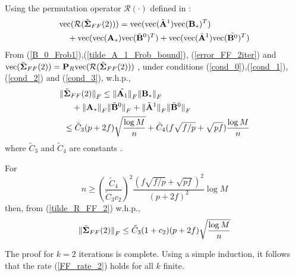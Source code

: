 \begin{IEEEproof}
Using the permutation operator $\mathcal{R}(\cdot)$ defined in \cite{EstCovMatKron}:
\begin{align}
	& { \text{vec} }(\mathcal{R}(\tilde{{\mathbf{\Sigma}}}_{FF}(2))) = { \text{vec} }({ \text{vec} }(\tilde{{\mathbf{A}}}^1){ \text{vec} }({\mathbf{B}}_*)^T) \nonumber \\
		&\quad + { \text{vec} }({ \text{vec} }({\mathbf{A}}_*){ \text{vec} }(\tilde{{\mathbf{B}}}^0)^T) + { \text{vec} }({ \text{vec} }(\tilde{{\mathbf{A}}}^1){ \text{vec} }(\tilde{{\mathbf{B}}^0})^T) \label{error_FF_2iter}
\end{align}
From (\ref{B_0_Frob1}),(\ref{tilde_A_1_Frob_bound}), (\ref{error_FF_2iter}) and ${ \text{vec} }(\tilde{{\mathbf{\Sigma}}}_{FF}(2)) = {\mathbf{P}}_R { \text{vec} }(\mathcal{R}(\tilde{{\mathbf{\Sigma}}}_{FF}(2)))$ \cite{EstCovMatKron}, under conditions (\ref{cond_0}),(\ref{cond_1}),(\ref{cond_2}) and (\ref{cond_3}), w.h.p.,
\begin{align}
	{ \parallel } &\tilde{{\mathbf{\Sigma}}}_{FF}(2) { \parallel }_F \leq { \parallel } \tilde{{\mathbf{A}}_1} { \parallel }_F { \parallel } {\mathbf{B}}_*{ \parallel }_F \nonumber \\
		&\quad + { \parallel } {\mathbf{A}}_*{ \parallel }_F { \parallel } \tilde{{\mathbf{B}}}^0 { \parallel }_F + { \parallel } \tilde{{\mathbf{A}}}^1{ \parallel }_F { \parallel } \tilde{{\mathbf{B}}}^0{ \parallel }_F \nonumber \\
		&\leq \tilde{C}_3 (p+2f) \sqrt{\frac{\log M}{n}} + \tilde{C}_4 (f\sqrt{f/p}+\sqrt{pf}) \frac{\log M}{n} \label{tilde_R_FF_2}
\end{align}
where $\tilde{C}_3$ and $\tilde{C}_4$ are constants \cite{TsiligkaridisTSP}.

For
\begin{equation*}
	n \geq (\frac{\tilde{C}_4}{\tilde{C}_3 c_2})^2 \frac{(f\sqrt{f/p}+\sqrt{pf})^2}{(p+2f)^2} \log M
\end{equation*}
then, from (\ref{tilde_R_FF_2}) w.h.p.,
\begin{equation*}
	{ \parallel } \tilde{{\mathbf{\Sigma}}}_{FF}(2){ \parallel }_F \leq \tilde{C}_3(1+c_2) (p+2f) \sqrt{\frac{\log M}{n}}
\end{equation*}

The proof for $k=2$ iterations is complete. Using a simple induction, it follows that the rate (\ref{FF_rate_2}) holds for all $k$ finite.



\end{IEEEproof}
